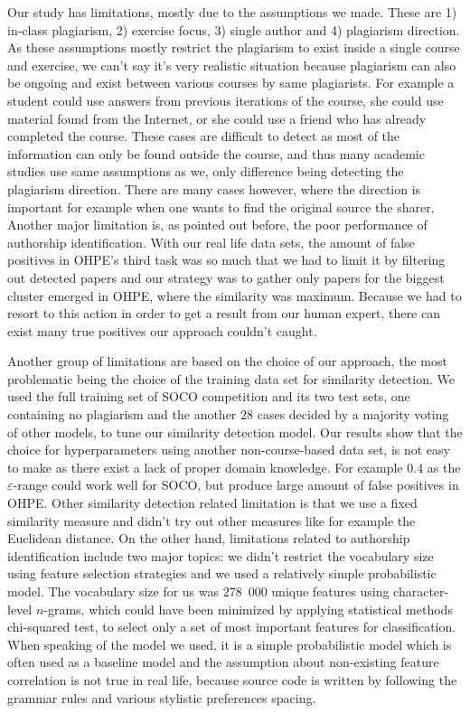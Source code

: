 Our study has limitations, mostly due to the assumptions we made. These are 1) in-class plagiarism, 2) exercise focus, 3) single author and 4) plagiarism direction. As these assumptions mostly restrict the plagiarism to exist inside a single course and exercise, we can't say it's very realistic situation because plagiarism can also be ongoing and exist between various courses by same plagiarists. For example a student could use answers from previous iterations of the course, she could use material found from the Internet, or she could use a friend who has already completed the course. These cases are difficult to detect as most of the information can only be found outside the course, and thus many academic studies use same assumptions as we, only difference being detecting the plagiarism direction. There are many cases however, where the direction is important for example when one wants to find the original source \ie the sharer. Another major limitation is, as pointed out before, the poor performance of authorship identification. With our real life data sets, the amount of false positives in OHPE's third task was so much that we had to limit it by filtering out detected papers and our strategy was to gather only papers for the biggest cluster emerged in OHPE, where the similarity was maximum. Because we had to resort to this action in order to get a result from our human expert, there can exist many true positives our approach couldn't caught. 

Another group of limitations are based on the choice of our approach, the most problematic being the choice of the training data set for similarity detection. We used the full training set of SOCO competition and its two test sets, one containing no plagiarism and the another 28 cases decided by a majority voting of other models, to tune our similarity detection model. Our results show that the choice for hyperparameters using another non-course-based data set, is not easy to make as there exist a lack of proper domain knowledge. For example 0.4 as the $\varepsilon$-range could work well for SOCO, but produce large amount of false positives in OHPE. Other similarity detection related limitation is that we use a fixed similarity measure and didn't try out other measures like for example the Euclidean distance. On the other hand, limitations related to authorship identification include two major topics: we didn't restrict the vocabulary size using feature selection strategies and we used a relatively simple probabilistic model. The vocabulary size for us was 278\, 000 unique features using character-level $n$-grams, which could have been minimized by applying statistical methods \eg chi-squared test, to select only a set of most important features for classification. When speaking of the model we used, it is a simple probabilistic model which is often used as a baseline model and the assumption about non-existing feature correlation is not true in real life, because source code is written by following the grammar rules and various stylistic preferences \eg spacing. 

